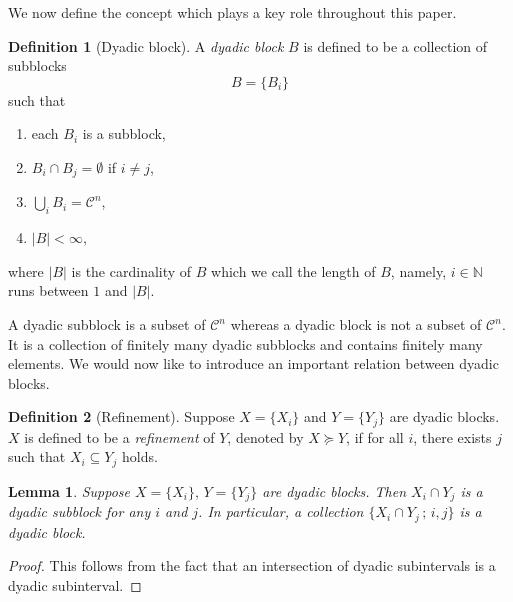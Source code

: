 \documentclass[12pt,reqno]{amsart}
\theoremstyle{plain}
\newtheorem{lemma}[theorem]{Lemma}
\theoremstyle{definition}
\newtheorem{definition}{Definition}[section]
\theoremstyle{remark}
\numberwithin{equation}{section}
\begin{document}
We now define the concept which plays a key role throughout this paper.  

\begin{definition}[Dyadic block]  
	A {\it dyadic block}  $B$  is defined to be a collection of subblocks
	\begin{equation*} 
		B = \{ B_i \} 
	\end{equation*} 
	such that 
	\begin{enumerate} 
	\item  
		each  $B_i$  is a subblock, 
	\item 
		$B_i \cap B_j = \emptyset$  if  $i \ne j$,   
	\item 
		$\bigcup_i B_i = \mathcal{C}^n $,  
	\item 
		$| B | < \infty$,  
	\end{enumerate} 
	where  $|B|$  is the cardinality of  $B$  which we call the length of  $B$, 
	namely, 
	$i \in \mathbb{N}$  runs between  $1$  and  $|B|$.
\end{definition} 

A dyadic subblock is a subset of  $\mathcal{C}^n $ 
whereas a dyadic block is not a subset of  $\mathcal{C}^n $.  
It is  a collection of finitely many dyadic subblocks 
and contains finitely many elements. 
We would now like to introduce an important relation between 
dyadic blocks.  

\begin{definition}[Refinement] 
	Suppose  $X = \{ X_i \}$  and  $Y = \{ Y_j \}$  are dyadic blocks. 
	$X$  is defined to be a {\it refinement} of  $Y$, 
	denoted by  $X \succeq Y$,  
	if for all  $i$, 
	there exists $j$  such that  $X_i \subseteq Y_j$ holds.    
\end{definition} 

\begin{lemma}\label{Lem:Intersection} 
	Suppose  $X = \{ X_i \}, \, Y = \{ Y_j \}$  are dyadic blocks. 
	Then  $X_i \cap Y_j$  is a dyadic subblock for any  $i$  and  $j$.  
	In particular, 
	a collection  $\{ X_i \cap Y_j \, ; \, i, j \}$  is a dyadic block.  
\end{lemma} 
\begin{proof} 
	This follows from the fact that 
	an intersection of dyadic subintervals is a dyadic subinterval.  
\end{proof} 
\end{document}
